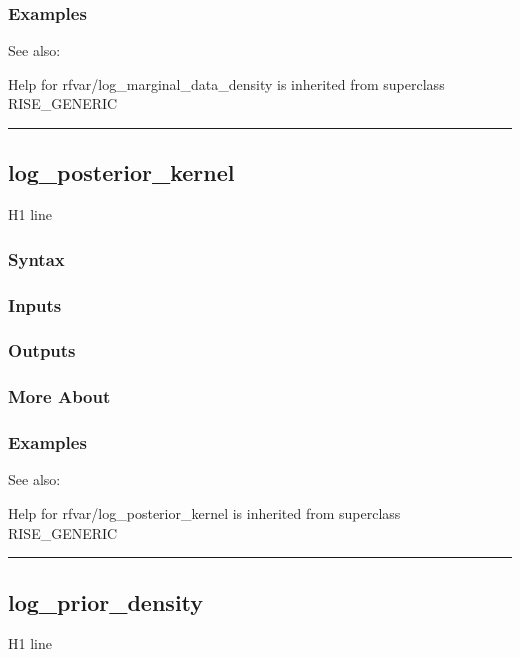 \documentclass[letterpaper,10pt,english]{sphinxmanual}
\begin{document}
\subsubsection{Examples}
\label{classes/models/@rfvar/rfvar:id57}
See also:

Help for rfvar/log\_marginal\_data\_density is inherited from superclass RISE\_GENERIC


\bigskip\hrule{}\bigskip



\subsection{log\_posterior\_kernel}
\label{classes/models/@rfvar/rfvar:log-posterior-kernel}\label{classes/models/@rfvar/rfvar:id58}
H1 line


\subsubsection{Syntax}
\label{classes/models/@rfvar/rfvar:id59}

\subsubsection{Inputs}
\label{classes/models/@rfvar/rfvar:id60}

\subsubsection{Outputs}
\label{classes/models/@rfvar/rfvar:id61}

\subsubsection{More About}
\label{classes/models/@rfvar/rfvar:id62}

\subsubsection{Examples}
\label{classes/models/@rfvar/rfvar:id63}
See also:

Help for rfvar/log\_posterior\_kernel is inherited from superclass RISE\_GENERIC


\bigskip\hrule{}\bigskip



\subsection{log\_prior\_density}
\label{classes/models/@rfvar/rfvar:id64}\label{classes/models/@rfvar/rfvar:log-prior-density}
H1 line
\end{document}
